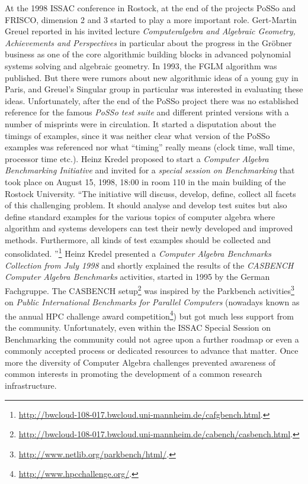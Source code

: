 \documentclass[12pt]{article}
\begin{document}
At the 1998 ISSAC conference in Rostock, at the end of the projects PoSSo and
FRISCO, dimension 2 and 3 started to play a more important role.  Gert-Martin
Greuel reported in his invited lecture \emph{Computeralgebra and Algebraic
  Geometry, Achievements and Perspectives} in particular about the progress in
the Gr\"obner business as one of the core algorithmic building blocks in
advanced polynomial systems solving and algebraic geometry.  In 1993, the FGLM
algorithm was published. But there were rumors about new algorithmic ideas of a
young guy in Paris, and Greuel's Singular group in particular was interested in
evaluating these ideas.  Unfortunately, after the end of the PoSSo project
there was no established reference for the famous \emph{PoSSo test suite} and
different printed versions with a number of misprints were in circulation.  It
started a disputation about the timings of examples, since it was neither clear
what version of the PoSSo examples was referenced nor what ``timing'' really
means (clock time, wall time, processor time etc.).  Heinz Kredel proposed to
start a \emph{Computer Algebra Benchmarking Initiative} and invited for a
\emph{special session on Benchmarking} that took place on August 15, 1998,
18:00 in room 110 in the main building of the Rostock University.  ``The
initiative will discuss, develop, define, collect all facets of this
challenging problem. It should analyse and develop test suites but also define
standard examples for the various topics of computer algebra where algorithm
and systems developers can test their newly developed and improved
methods. Furthermore, all kinds of test examples should be collected and
consolidated. ''\footnote{\url{http://bwcloud-108-017.bwcloud.uni-mannheim.de/cafgbench.html}.}
Heinz Kredel presented a \emph{Computer Algebra Benchmarks Collection from July
  1998} and shortly explained the results of the \emph{CASBENCH Computer
  Algebra Benchmarks} activities, started in 1995 by the German Fachgruppe.
The CASBENCH
setup\footnote{\url{http://bwcloud-108-017.bwcloud.uni-mannheim.de/cabench/casbench.html}.}
was inspired by the Parkbench
activities\footnote{\url{http://www.netlib.org/parkbench/html/}.} on
\emph{Public International Benchmarks for Parallel Computers} (nowadays known
as the annual HPC challenge award
competition\footnote{\url{http://www.hpcchallenge.org/}.}) but got much less
support from the community. Unfortunately, even within the ISSAC Special
Session on Benchmarking the community could not agree upon a further roadmap or
even a commonly accepted process or dedicated resources to advance that
matter. Once more the diversity of Computer Algebra challenges prevented
awareness of common interests in promoting the development of a common research
infrastructure.
\end{document}
